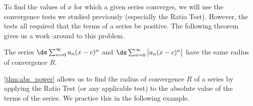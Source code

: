 To find the values of $x$ for which a given series converges, we will use the convergence tests we studied previously (especially the Ratio Test). However, the tests all required that the terms of a series be positive. The following theorem gives us a work--around to this problem.

{%
	The series $\ds \sum_{n=0}^\infty a_n(x-c)^n$ and $\ds \sum_{n=0}^\infty \big|a_n(x-c)^n\big|$ have the same radius of convergence $R$.
}


\autoref{thm:abs_power} allows us to find the radius of convergence $R$ of a series by applying the Ratio Test (or any applicable test) to the absolute value of the terms of the series. We practice this in the following example.

\clearpage

